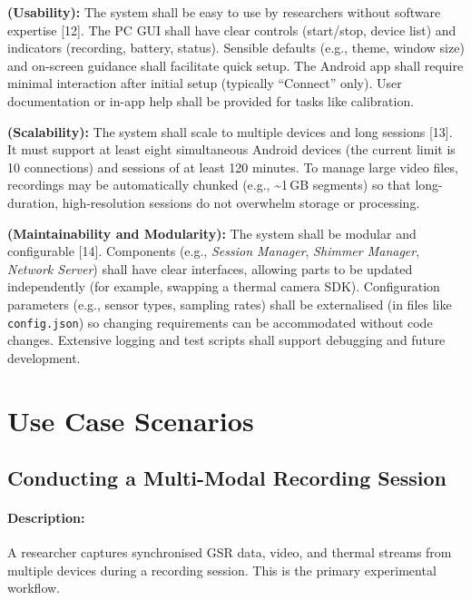 \begin{description}[style=unboxed,leftmargin=0cm]
    \item[\textbf{NFR6}] \textbf{(Usability):} The system shall be easy to use by researchers without software expertise [12]. The PC GUI shall have clear controls (start/stop, device list) and indicators (recording, battery, status). Sensible defaults (e.g., theme, window size) and on-screen guidance shall facilitate quick setup. The Android app shall require minimal interaction after initial setup (typically “Connect” only). User documentation or in-app help shall be provided for tasks like calibration.

    \item[\textbf{NFR7}] \textbf{(Scalability):} The system shall scale to multiple devices and long sessions [13]. It must support at least eight simultaneous Android devices (the current limit is 10 connections) and sessions of at least 120 minutes. To manage large video files, recordings may be automatically chunked (e.g., \textasciitilde1\,GB segments) so that long-duration, high-resolution sessions do not overwhelm storage or processing.

    \item[\textbf{NFR8}] \textbf{(Maintainability and Modularity):} The system shall be modular and configurable [14]. Components (e.g., \textit{Session Manager}, \textit{Shimmer Manager}, \textit{Network Server}) shall have clear interfaces, allowing parts to be updated independently (for example, swapping a thermal camera SDK). Configuration parameters (e.g., sensor types, sampling rates) shall be externalised (in files like \texttt{config.json}) so changing requirements can be accommodated without code changes. Extensive logging and test scripts shall support debugging and future development.
\end{description}


\section{Use Case Scenarios}

\subsection{Conducting a Multi-Modal Recording Session}

\paragraph{Description:} A researcher captures synchronised GSR data, video, and thermal streams from multiple devices during a recording session. This is the primary experimental workflow.

